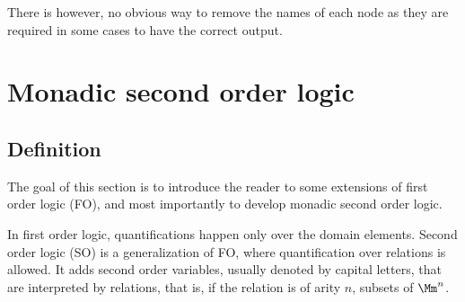 There is however, no obvious way to remove the names of each node
as they are required in some cases to have the correct output.






\section{Monadic second order logic}
\subsection{Definition}

The goal of this section is to introduce the reader
to some extensions of first order logic (FO),
and most importantly to develop monadic second order logic.

In first order logic, quantifications happen only over the
domain elements.
Second order logic (SO) is a generalization of FO,
where quantification over relations is allowed.
It adds second order variables, usually denoted by capital
letters, that are interpreted by relations, that is,
if the relation is of arity $n$, subsets of $\Mm^n$.

